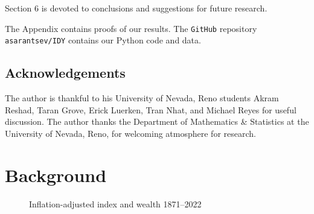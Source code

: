 \documentclass[12pt]{amsart}
\theoremstyle{definition}
\begin{document}
Section 6 is devoted to conclusions and suggestions for future research.

The Appendix contains proofs of our results. The \texttt{GitHub} repository \texttt{asarantsev/IDY} contains our Python code and data.

\subsection{Acknowledgements} The author is thankful to his University of Nevada, Reno students Akram Reshad, Taran Grove, Erick Luerken, Tran Nhat, and Michael Reyes for useful discussion. The author thanks the Department of Mathematics \& Statistics at the University of Nevada, Reno, for welcoming atmosphere for research.



\section{Background}

\begin{figure}[t]
\caption{Inflation-adjusted index and wealth 1871--2022}
\label{fig:index}
\end{figure}
\end{document}
